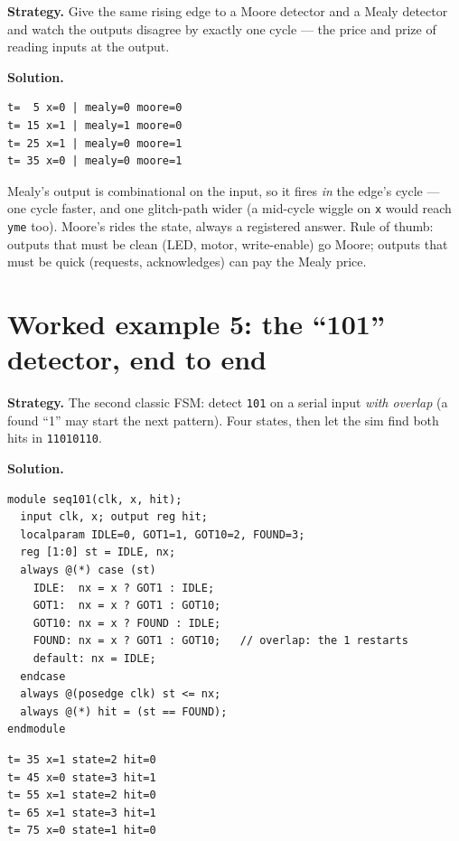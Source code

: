 \textbf{Strategy.} Give the same rising edge to a Moore detector and a
Mealy detector and watch the outputs disagree by exactly one cycle —
the price and prize of reading inputs at the output.

\textbf{Solution.}
\begin{lstlisting}[caption={\ttfamily code/ch10\_mm\_tb.v run ---
\texttt{mealy=1} at t=15, the cycle the edge lands;
\texttt{moore=1} waits for t=25.},abovecaptionskip=0pt]
t=  5 x=0 | mealy=0 moore=0
t= 15 x=1 | mealy=1 moore=0
t= 25 x=1 | mealy=0 moore=1
t= 35 x=0 | mealy=0 moore=1
\end{lstlisting}

Mealy's output is combinational on the input, so it fires \emph{in} the
edge's cycle — one cycle faster, and one glitch-path wider (a mid-cycle
wiggle on \texttt{x} would reach \texttt{yme} too). Moore's rides the
state, always a registered answer. Rule of thumb: outputs that must be
clean (LED, motor, write-enable) go Moore; outputs that must be quick
(requests, acknowledges) can pay the Mealy price.

\section{Worked example 5: the ``101'' detector, end to end}
\label{sec:we-seq101}

\textbf{Strategy.} The second classic FSM: detect \texttt{101} on a
serial input \emph{with overlap} (a found ``1'' may start the next
pattern). Four states, then let the sim find both hits in
\texttt{11010110}.

\textbf{Solution.}
\begin{lstlisting}[caption={\ttfamily code/ch10\_seq101.v --- the
overlap lives in \texttt{FOUND}'s edges.},label={lst:seq101},abovecaptionskip=0pt]
module seq101(clk, x, hit);
  input clk, x; output reg hit;
  localparam IDLE=0, GOT1=1, GOT10=2, FOUND=3;
  reg [1:0] st = IDLE, nx;
  always @(*) case (st)
    IDLE:  nx = x ? GOT1 : IDLE;
    GOT1:  nx = x ? GOT1 : GOT10;
    GOT10: nx = x ? FOUND : IDLE;
    FOUND: nx = x ? GOT1 : GOT10;   // overlap: the 1 restarts
    default: nx = IDLE;
  endcase
  always @(posedge clk) st <= nx;
  always @(*) hit = (st == FOUND);
endmodule
\end{lstlisting}

\begin{lstlisting}[caption={Real run over \texttt{11010110} --- hits at
t=45 and t=65, the second riding the first's last bit.},abovecaptionskip=0pt]
t= 35 x=1 state=2 hit=0
t= 45 x=0 state=3 hit=1
t= 55 x=1 state=2 hit=0
t= 65 x=1 state=3 hit=1
t= 75 x=0 state=1 hit=0
\end{lstlisting}

